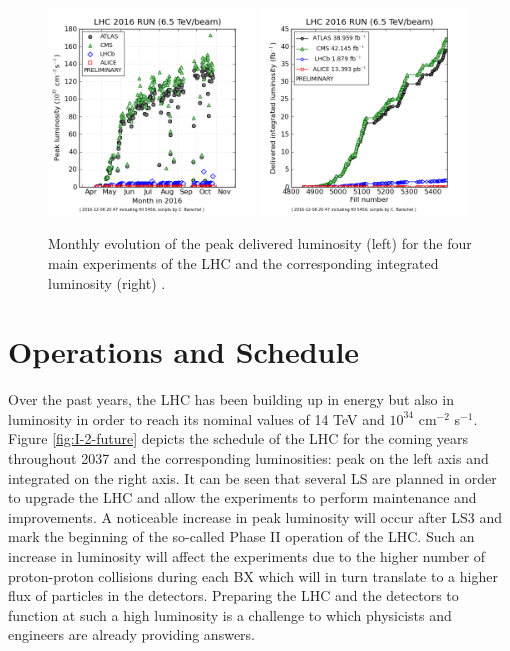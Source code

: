 		\begin{figure}[t!]
			\centering
			\includegraphics[width=0.49\textwidth]{img/I-2-LHC/luminosity-peak.png}
			\includegraphics[width=0.49\textwidth]{img/I-2-LHC/luminosity-integrated.png}
			\caption{Monthly evolution of the peak delivered luminosity (left) for the four main experiments of the LHC and the corresponding integrated luminosity (right) \cite{LUMI-PP-LPC}.}
			\label{fig:I-2-luminosity}
		\end{figure}

	\section{Operations and Schedule}

    Over the past years, the LHC has been building up in energy but also in luminosity in order to reach its nominal values of 14 TeV and $ 10^{34} $ cm$^{-2}$ s$^{-1}$. Figure \ref{fig:I-2-future} depicts the schedule of the LHC for the coming years throughout 2037 and the corresponding luminosities: peak on the left axis and integrated on the right axis. It can be seen that several LS are planned in order to upgrade the LHC and allow the experiments to perform maintenance and improvements. A noticeable increase in peak luminosity will occur after LS3 and mark the beginning of the so-called Phase II operation of the LHC. Such an increase in luminosity will affect the experiments due to the higher number of proton-proton collisions during each BX which will in turn translate to a higher flux of particles in the detectors. Preparing the LHC and the detectors to function at such a high luminosity is a challenge to which physicists and engineers are already providing answers.

